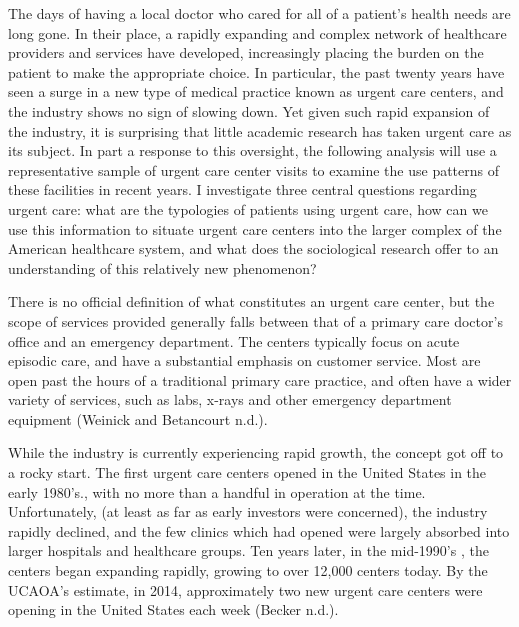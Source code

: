 \documentclass[12pt,twoside]{reedthesis}
\begin{document}
  The days of having a local doctor who cared for all of a patient's
  health needs are long gone. In their place, a rapidly expanding and
  complex network of healthcare providers and services have developed,
  increasingly placing the burden on the patient to make the appropriate
  choice. In particular, the past twenty years have seen a surge in a new
  type of medical practice known as urgent care centers, and the industry
  shows no sign of slowing down. Yet given such rapid expansion of the
  industry, it is surprising that little academic research has taken
  urgent care as its subject. In part a response to this oversight, the
  following analysis will use a representative sample of urgent care
  center visits to examine the use patterns of these facilities in recent
  years. I investigate three central questions regarding urgent care: what
  are the typologies of patients using urgent care, how can we use this
  information to situate urgent care centers into the larger complex of
  the American healthcare system, and what does the sociological research
  offer to an understanding of this relatively new phenomenon?
  
  There is no official definition of what constitutes an urgent care
  center, but the scope of services provided generally falls between that
  of a primary care doctor's office and an emergency department. The
  centers typically focus on acute episodic care, and have a substantial
  emphasis on customer service. Most are open past the hours of a
  traditional primary care practice, and often have a wider variety of
  services, such as labs, x-rays and other emergency department equipment
  (Weinick and Betancourt n.d.).
  
  While the industry is currently experiencing rapid growth, the concept
  got off to a rocky start. The first urgent care centers opened in the
  United States in the early 1980's., with no more than a handful in
  operation at the time. Unfortunately, (at least as far as early
  investors were concerned), the industry rapidly declined, and the few
  clinics which had opened were largely absorbed into larger hospitals and
  healthcare groups. Ten years later, in the mid-1990's , the centers
  began expanding rapidly, growing to over 12,000 centers today. By the
  UCAOA's estimate, in 2014, approximately two new urgent care centers
  were opening in the United States each week (Becker n.d.).
  
\end{document}
